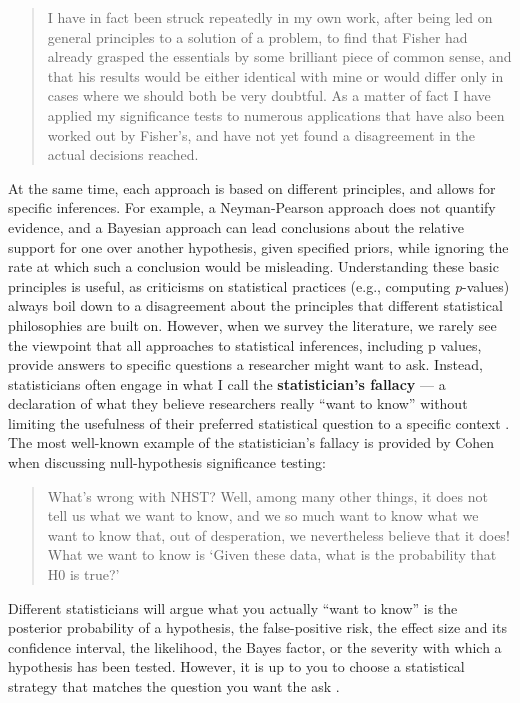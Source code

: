 \documentclass[
]{krantz}
\begin{document}
\begin{quote}
I have in fact been struck repeatedly in my own work, after being led on general principles to a solution of a problem, to find that Fisher had already grasped the essentials by some brilliant piece of common sense, and that his results would be either identical with mine or would differ only in cases where we should both be very doubtful. As a matter of fact I have applied my significance tests to numerous applications that have also been worked out by Fisher's, and have not yet found a disagreement in the actual decisions reached.
\end{quote}

At the same time, each approach is based on different principles, and allows for specific inferences. For example, a Neyman-Pearson approach does not quantify evidence, and a Bayesian approach can lead conclusions about the relative support for one over another hypothesis, given specified priors, while ignoring the rate at which such a conclusion would be misleading. Understanding these basic principles is useful, as criticisms on statistical practices (e.g., computing \emph{p}-values) always boil down to a disagreement about the principles that different statistical philosophies are built on. However, when we survey the literature, we rarely see the viewpoint that all approaches to statistical inferences, including p values, provide answers to specific questions a researcher might want to ask. Instead, statisticians often engage in what I call the \textbf{statistician's
fallacy} --- a declaration of what they believe researchers really ``want to know'' without limiting the usefulness of their preferred statistical question to a specific context \citep{lakens_practical_2021}. The most well-known example of the statistician's fallacy is provided by Cohen \citeyearpar{cohen_earth_1994} when discussing null-hypothesis significance testing:

\begin{quote}
What's wrong with NHST? Well, among many other things, it does not tell us what we want to know, and we so much want to know what we want to know that, out of desperation, we nevertheless believe that it does! What we want to know is `Given these data, what is the probability that H0 is true?'
\end{quote}

Different statisticians will argue what you actually ``want to know'' is the posterior probability of a hypothesis, the false-positive risk, the effect size and its confidence interval, the likelihood, the Bayes factor, or the severity with which a hypothesis has been tested. However, it is up to you to choose a statistical strategy that matches the question you want the ask \citep{hand_deconstructing_1994}.
\end{document}
